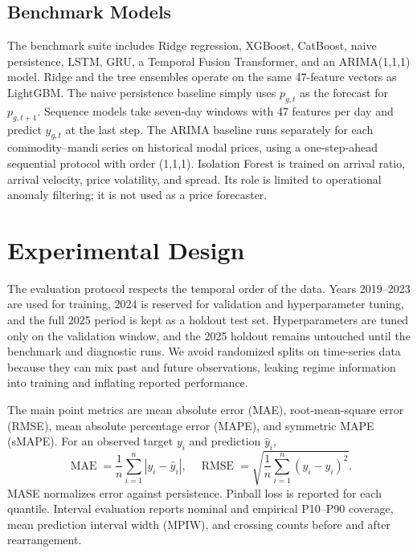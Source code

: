 \documentclass[a4paper,conference]{IEEEtran}
\begin{document}
\subsection{Benchmark Models}
The benchmark suite includes Ridge regression, XGBoost, CatBoost, naive persistence, LSTM, GRU, a Temporal Fusion Transformer, and an ARIMA(1,1,1) model. Ridge and the tree ensembles operate on the same 47-feature vectors as LightGBM. The naive persistence baseline simply uses $p_{g,t}$ as the forecast for $p_{g,t+1}$. Sequence models take seven-day windows with 47 features per day and predict $y_{g,t}$ at the last step. The ARIMA baseline runs separately for each commodity--mandi series on historical modal prices, using a one-step-ahead sequential protocol with order (1,1,1). Isolation Forest is trained on arrival ratio, arrival velocity, price volatility, and spread. Its role is limited to operational anomaly filtering; it is not used as a price forecaster.

\section{Experimental Design}
The evaluation protocol respects the temporal order of the data. Years 2019--2023 are used for training, 2024 is reserved for validation and hyperparameter tuning, and the full 2025 period is kept as a holdout test set. Hyperparameters are tuned only on the validation window, and the 2025 holdout remains untouched until the benchmark and diagnostic runs. We avoid randomized splits on time-series data because they can mix past and future observations, leaking regime information into training and inflating reported performance.

The main point metrics are mean absolute error (MAE), root-mean-square error (RMSE), mean absolute percentage error (MAPE), and symmetric MAPE (sMAPE). For an observed target $y_i$ and prediction $\hat{y}_i$,
\begin{equation}
\operatorname{MAE} = \frac{1}{n}\sum_{i=1}^{n} |y_i - \hat{y}_i|,\quad
\operatorname{RMSE} = \sqrt{\frac{1}{n}\sum_{i=1}^{n} (y_i - \hat{y}_i)^2}.
\label{eq:metrics}
\end{equation}
MASE normalizes error against persistence. Pinball loss is reported for each quantile. Interval evaluation reports nominal and empirical P10--P90 coverage, mean prediction interval width (MPIW), and crossing counts before and after rearrangement.
\end{document}
